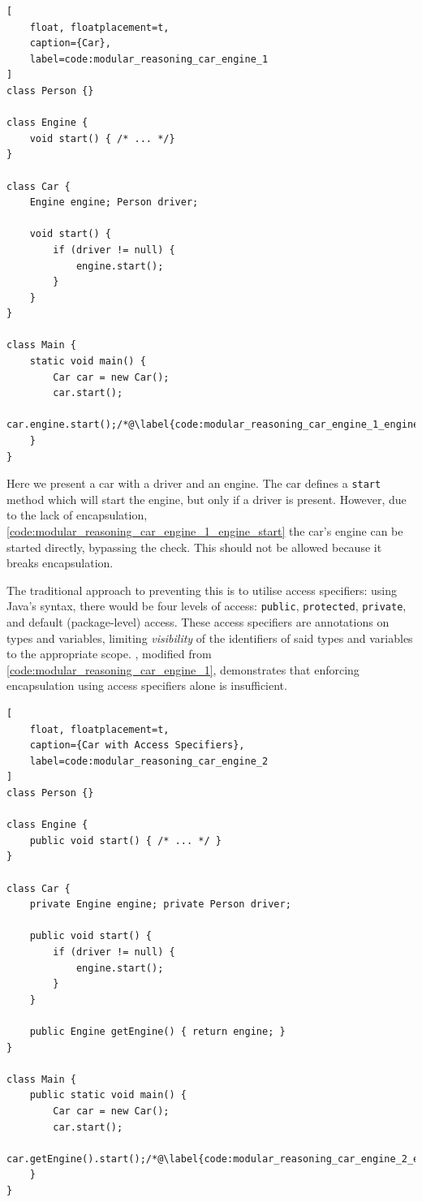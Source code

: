 \documentclass{acm_proc_article-sp}
\begin{document}
\begin{lstlisting}[
	float, floatplacement=t,
	caption={Car},
	label=code:modular_reasoning_car_engine_1
]
class Person {}

class Engine {
	void start() { /* ... */}
}

class Car {
	Engine engine; Person driver;

	void start() {
		if (driver != null) {
			engine.start();
		}
	}
}

class Main {
	static void main() {
		Car car = new Car();
		car.start();
		car.engine.start();/*@\label{code:modular_reasoning_car_engine_1_engine_start}@*/
	}
}
\end{lstlisting}

Here we present a car with a driver and an engine. The car defines a 
\lstinline|start| method which will start the engine, but only if a driver is
present. However, due to the lack of encapsulation,
\cref{code:modular_reasoning_car_engine_1_engine_start} the car's engine can be
started directly, bypassing the check. This should not be allowed because
it breaks encapsulation.

The traditional approach to preventing this is to utilise access specifiers: 
using Java's syntax, there would be four levels of access: \lstinline|public|, 
\lstinline|protected|, \lstinline|private|, and default (package-level) access. 
These access specifiers are annotations on types and variables, limiting 
\emph{visibility} of the identifiers of said types and variables to the 
appropriate scope. , modified from 
\cref{code:modular_reasoning_car_engine_1}, demonstrates that enforcing 
encapsulation using access specifiers alone is insufficient.

\begin{lstlisting}[
	float, floatplacement=t,
	caption={Car with Access Specifiers},
	label=code:modular_reasoning_car_engine_2
]
class Person {}

class Engine {
	public void start() { /* ... */ }
}

class Car {
	private Engine engine; private Person driver;
	
	public void start() {
		if (driver != null) {
			engine.start();
		}
	}

	public Engine getEngine() { return engine; }
}

class Main {
	public static void main() {
		Car car = new Car();
		car.start();
		car.getEngine().start();/*@\label{code:modular_reasoning_car_engine_2_engine_start}@*/
	}
}

\end{lstlisting}
\end{document}
